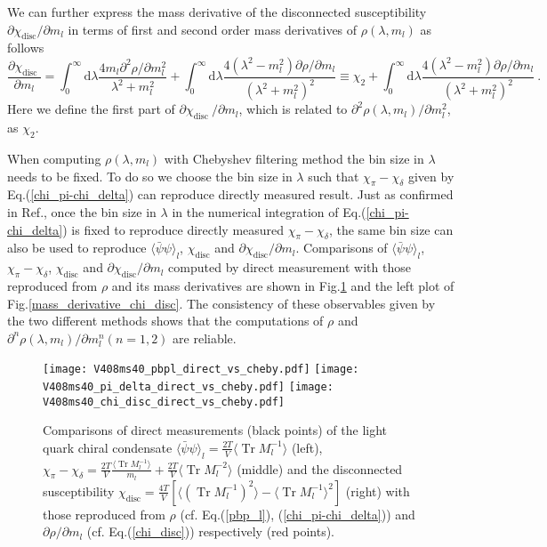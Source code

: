 \documentclass[a4paper,11pt]{article}
\numberwithin{equation}{section}
\begin{document}
We can further express the mass derivative of the disconnected susceptibility $\partial \chi_{\mathrm{disc}}/\partial m_l$ in terms of first and second order mass derivatives of $\rho(\lambda,m_l)$ as follows
\begin{equation}\label{mass_chi_rho}
\frac{\partial \chi_{\text {disc }}}{\partial m_{l}}
=
\int_{0}^{\infty} \mathrm{d} \lambda \frac{4 m_{l} \partial^{2} \rho / \partial m_{l}^{2}}{\lambda^{2}+m_{l}^{2}}
+
\int_{0}^{\infty} \mathrm{d} \lambda \frac{4(\lambda^{2}-m_{l}^{2}) \partial \rho / \partial m_{l}}{(\lambda^{2}+m_{l}^{2})^{2}}
\equiv \chi_2 
+
\int_{0}^{\infty} \mathrm{d} \lambda \frac{4(\lambda^{2}-m_{l}^{2}) \partial \rho / \partial m_{l}}{(\lambda^{2}+m_{l}^{2})^{2}}
~.
\end{equation}
Here we define the first part of $\partial \chi_{\text {disc }}/\partial m_{l}$, which is related to $\partial^2\rho(\lambda , m_l)/\partial m_l^2$, as $\chi_2$.




When computing $\rho(\lambda,m_l)$  with Chebyshev filtering method the bin size in $\lambda$ needs to be fixed. To do so we choose the bin size in $\lambda$ such that $\chi_{\pi}-\chi_{\delta}$ given by Eq.(\ref{chi_pi-chi_delta}) can reproduce directly measured result. Just as confirmed in Ref.\cite{Ding:2020xlj}, once the bin size in $\lambda$ in the numerical integration of Eq.(\ref{chi_pi-chi_delta}) is fixed to reproduce directly measured $\chi_{\pi}-\chi_{\delta}$, the same bin size can also be used to reproduce $\langle \bar{\psi}\psi\rangle_l$, $\chi_{\mathrm{disc}}$ and $\partial \chi_{\mathrm{disc}} / \partial m_l$.
Comparisons of  $\langle \bar{\psi}\psi\rangle_l$, $\chi_{\pi}-\chi_{\delta}$, $\chi_{\mathrm{disc}}$ and $\partial \chi_{\mathrm{disc}}/\partial m_l$ computed by direct measurement with those reproduced from $\rho$ and its mass derivatives are shown in Fig.\ref{comparison_pbp_chidisc} and the left plot of Fig.\ref{mass_derivative_chi_disc}. The consistency of these observables given by the two different methods shows that the computations of $\rho$ and $\partial^n\rho(\lambda, m_l)/\partial m_l^n (n=1,2)$ are reliable.
\begin{figure}[ht!]
\texttt{[image: V408ms40\_pbpl\_direct\_vs\_cheby.pdf]}
\texttt{[image: V408ms40\_pi\_delta\_direct\_vs\_cheby.pdf]}
\texttt{[image: V408ms40\_chi\_disc\_direct\_vs\_cheby.pdf]}
\caption{Comparisons of direct measurements (black points) of the light quark chiral condensate $\langle\bar{\psi}\psi\rangle_l=\frac{2 T}{V} \langle \operatorname{Tr} M_l^{-1}\rangle$ (left), $\chi_{\pi}-\chi_{\delta}=\frac{2 T}{V} \frac{\langle \operatorname{Tr} M_l^{-1}\rangle}{m_l} + \frac{2 T}{V} \langle \operatorname{Tr} M_l^{-2}\rangle$ (middle) and the disconnected susceptibility $\chi_{\mathrm{disc}}=\frac{4 T}{V} [\langle(\operatorname{Tr} M_{l}^{-1})^{2}\rangle-\langle\operatorname{Tr} M_{l}^{-1}\rangle^{2}]$ (right) with those reproduced from $\rho$ (cf. Eq.(\ref{pbp_l}), (\ref{chi_pi-chi_delta})) and $\partial \rho/\partial m_l$ (cf. Eq.(\ref{chi_disc})) respectively (red points).}
\label{comparison_pbp_chidisc}
\end{figure}
\end{document}
